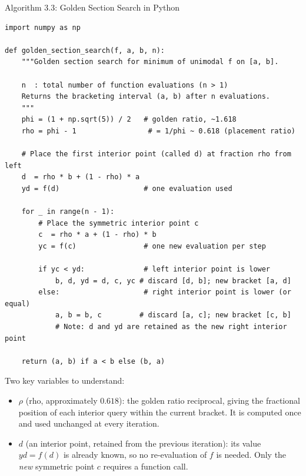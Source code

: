 \documentclass[aspectratio=169,10pt]{beamer}
\begin{document}
\begin{frame}[fragile]{Algorithm 3.3: Golden Section Search in Python}
\begin{lstlisting}[style=pycode, caption={Python: Golden section search on [a,b] with n total evaluations}]
import numpy as np

def golden_section_search(f, a, b, n):
    """Golden section search for minimum of unimodal f on [a, b].

    n  : total number of function evaluations (n > 1)
    Returns the bracketing interval (a, b) after n evaluations.
    """
    phi = (1 + np.sqrt(5)) / 2   # golden ratio, ~1.618
    rho = phi - 1                 # = 1/phi ~ 0.618 (placement ratio)

    # Place the first interior point (called d) at fraction rho from left
    d  = rho * b + (1 - rho) * a
    yd = f(d)                    # one evaluation used

    for _ in range(n - 1):
        # Place the symmetric interior point c
        c  = rho * a + (1 - rho) * b
        yc = f(c)                # one new evaluation per step

        if yc < yd:              # left interior point is lower
            b, d, yd = d, c, yc # discard [d, b]; new bracket [a, d]
        else:                    # right interior point is lower (or equal)
            a, b = b, c         # discard [a, c]; new bracket [c, b]
            # Note: d and yd are retained as the new right interior point

    return (a, b) if a < b else (b, a)
\end{lstlisting}

  \medskip
  Two key variables to understand:
  \begin{itemize}
    \item $\rho$ (rho, approximately $0.618$): the golden ratio reciprocal,
          giving the fractional position of each interior query within the
          current bracket.  It is computed once and used unchanged at every
          iteration.
    \item $d$ (an interior point, retained from the previous iteration):
          its value $yd = f(d)$ is already known, so no re-evaluation of
          $f$ is needed.  Only the \emph{new} symmetric point $c$ requires
          a function call.
  \end{itemize}
\end{frame}
\end{document}
